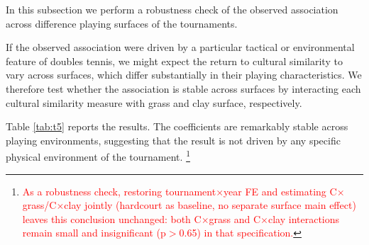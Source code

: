 \documentclass[10pt]{article}
\begin{document}
In this subsection we perform a robustness check of the observed association across difference playing surfaces of the tournaments.  

If the observed association were driven by a particular tactical or environmental feature of doubles tennis, we might expect the return to cultural similarity to vary across surfaces, which differ substantially in their playing characteristics. We therefore test whether the association is stable across surfaces by interacting each cultural similarity measure with grass and clay surface, respectively. 


Table \ref{tab:t5} reports the results. The coefficients are remarkably stable across playing environments, suggesting that the result is not driven by any specific physical environment of the tournament. \footnote{\textcolor{red}{As a robustness check, restoring tournament$\times$year FE and estimating C$\times$grass/C$\times$clay jointly (hardcourt as baseline, no separate surface main effect) leaves this conclusion unchanged: both C$\times$grass and C$\times$clay interactions remain small and insignificant (p$>$0.65) in that specification.}} 
\end{document}

